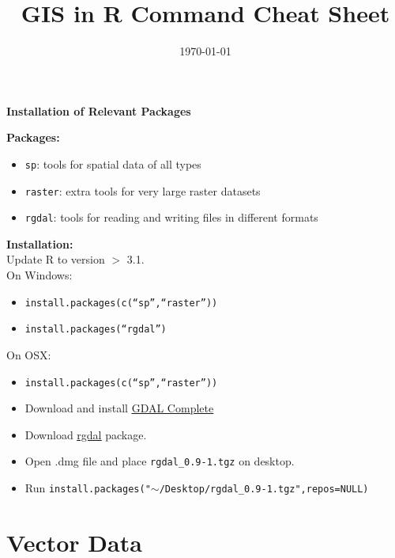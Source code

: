 \documentclass[10pt]{article}
\title{GIS in R Command Cheat Sheet}
\date{\today}
\begin{document}
 
\maketitle

	
\centerline{\textbf{Installation of Relevant Packages}}
\textbf{Packages:}
\begin{itemize}
	\item \texttt{sp}: tools for spatial data of all types
	\item \texttt{raster}: extra tools for very large raster datasets
	\item \texttt{rgdal}: tools for reading and writing files in different formats
\end{itemize}
\textbf{Installation:}\\
Update R to version $>$ 3.1.\\
On Windows:
\begin{itemize}
	\item \texttt{install.packages(c(``sp'',``raster''))}
	\item \texttt{install.packages(``rgdal'')}
\end{itemize}
On OSX:
	\begin{itemize}
		\item \texttt{install.packages(c(``sp'',``raster''))}
		\item Download and install 	\href{http://www.kyngchaos.com/files/software/frameworks/GDAL_Complete-1.11.dmg}{\underline{GDAL Complete}}
		\item Download \href{http://www.kyngchaos.com/files/software/frameworks/rgdal-0.9.1-1.dmg}{\underline{rgdal}} package. 
		\item Open .dmg file and place \texttt{rgdal\_0.9-1.tgz} on desktop.
		\item Run \texttt{install.packages("$\sim$/Desktop/rgdal\_0.9-1.tgz",repos=NULL)}
	\end{itemize}



\section*{Vector Data}

\end{document}
